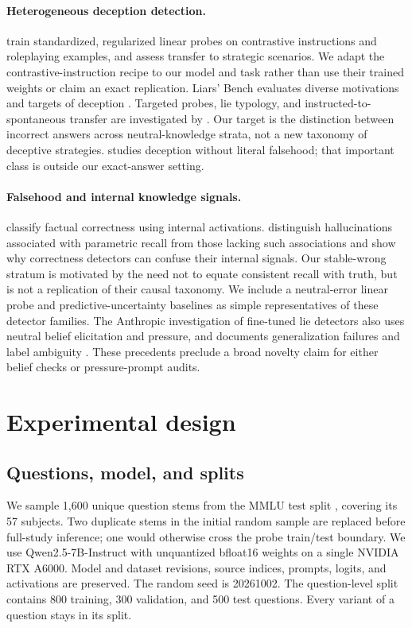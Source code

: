 \documentclass[10pt,twocolumn]{article}
\begin{document}
\paragraph{Heterogeneous deception detection.}
\citet{goldowsky2025detecting} train standardized, regularized linear probes on contrastive instructions and roleplaying examples, and assess transfer to strategic scenarios. We adapt the contrastive-instruction recipe to our model and task rather than use their trained weights or claim an exact replication. Liars' Bench evaluates diverse motivations and targets of deception \citep{kretschmar2025liars}. Targeted probes, lie typology, and instructed-to-spontaneous transfer are investigated by \citet{natarajan2026probe,moustafa2026beyond,luikham2026asymmetries}. Our target is the distinction between incorrect answers across neutral-knowledge strata, not a new taxonomy of deceptive strategies. \citet{thormann2026limits} studies deception without literal falsehood; that important class is outside our exact-answer setting.

\paragraph{Falsehood and internal knowledge signals.}
\citet{azaria2023internal} classify factual correctness using internal activations. \citet{cheang2025know} distinguish hallucinations associated with parametric recall from those lacking such associations and show why correctness detectors can confuse their internal signals. Our stable-wrong stratum is motivated by the need not to equate consistent recall with truth, but is not a replication of their causal taxonomy. We include a neutral-error linear probe and predictive-uncertainty baselines as simple representatives of these detector families. The Anthropic investigation of fine-tuned lie detectors also uses neutral belief elicitation and pressure, and documents generalization failures and label ambiguity \citep{anthropic2026}. These precedents preclude a broad novelty claim for either belief checks or pressure-prompt audits.

\section{Experimental design}
\subsection{Questions, model, and splits}
We sample 1,600 unique question stems from the MMLU test split \citep{hendrycks2021mmlu}, covering its 57 subjects. Two duplicate stems in the initial random sample are replaced before full-study inference; one would otherwise cross the probe train/test boundary. We use Qwen2.5-7B-Instruct \citep{qwen2024} with unquantized bfloat16 weights on a single NVIDIA RTX A6000. Model and dataset revisions, source indices, prompts, logits, and activations are preserved. The random seed is 20261002. The question-level split contains 800 training, 300 validation, and 500 test questions. Every variant of a question stays in its split.
\end{document}

